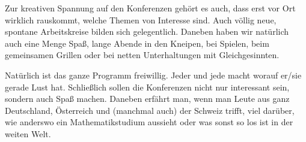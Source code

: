 Zur kreativen Spannung auf den Konferenzen gehört es auch, dass erst vor Ort
wirklich rauskommt, welche Themen von Interesse sind. Auch völlig neue,
spontane Arbeitskreise bilden sich gelegentlich. Daneben haben wir natürlich
auch eine Menge Spaß, lange Abende in den Kneipen, bei Spielen, beim
gemeinsamen Grillen oder bei netten Unterhaltungen mit Gleichgesinnten.

Natürlich ist das ganze Programm freiwillig. Jeder und jede macht worauf er/sie
gerade Lust hat. Schließlich sollen die Konferenzen nicht nur interessant sein,
sondern auch Spaß machen.  Daneben erfährt man, wenn man Leute aus ganz
Deutschland, Österreich und (manchmal auch) der Schweiz trifft, viel darüber,
wie anderswo ein Mathematikstudium aussieht oder was sonst so los ist in der
weiten Welt.
